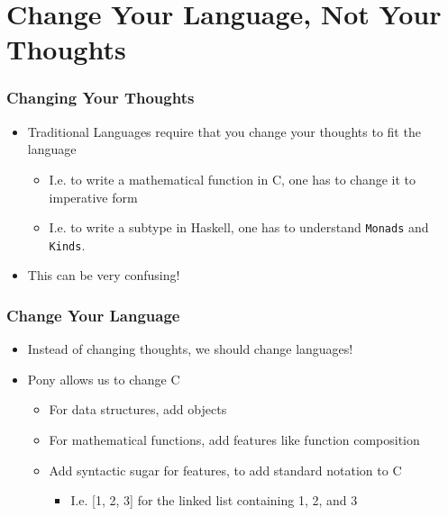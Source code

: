 \documentclass[bigger]{beamer}
\begin{document}
\section{Change Your Language, Not Your Thoughts}
\label{sec-2}
\begin{frame}
\frametitle{Changing Your Thoughts}
\label{sec-2-1}



\begin{itemize}
\item Traditional Languages require that you change your thoughts to fit the language
\begin{itemize}
\item I.e. to write a mathematical function in C, one has to change it to imperative form
\item I.e. to write a subtype in Haskell, one has to understand \verb~Monads~ and \verb~Kinds~.
\end{itemize}
\item This can be very confusing!
\end{itemize}
  
\end{frame}
\begin{frame}
\frametitle{Change Your Language}
\label{sec-2-2}



\begin{itemize}
\item Instead of changing thoughts, we should change languages!
\item Pony allows us to change C
\begin{itemize}
\item For data structures, add objects
\item For mathematical functions, add features like function composition
\item Add syntactic sugar for features, to add standard notation to C
\begin{itemize}
\item I.e. [1, 2, 3] for the linked list containing 1, 2, and 3
\end{itemize}
\end{itemize}
\end{itemize}
\end{frame}
\end{document}
